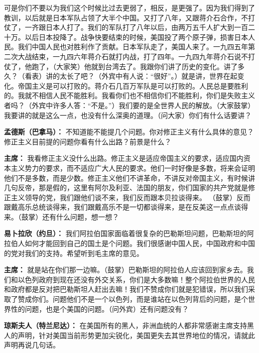 \begin{list}{}
可是你们不要以为我们这个时候比过去更弱了，相反，是更强了。因为我们得到了教训，以后就是日本军队占领了大半个中国。又打了八年，又跟蒋介石合作，不打仗了，一齐跟日本人打了。我们的军队打了八年以后，由两万五千人扩大到一百二十万。以后日本投降了。战争快要结束的时候，美国投了两个原子弹，损害日本人民。我们中国人民也对胜利作了贡献。日本军队走了，美国人来了。一九四五年第二次大战结束，一九四六年蒋介石就打内战，打了四年。一九四九年蒋介石说不打仗了，他跑了，（大家笑）他就到台湾去了。我跟你们讲了历史的变化。讲了多久？（看表）讲的太长了吧？（外宾中有人说：“很好”。）就是讲，世界在起变化。帝国主义是可以打败的。蒋介石几百万军队是可以打败的。人民总是要胜利的。我就不相信人民不能胜利。我看你们也不相信你们不能胜利，你们是失败主义者吗？（外宾中许多人答：“不是。”）我们要的是全世界人民的解放。（大家鼓掌）我要讲的就是这么一点，也没有什么深奥的道理。（问大家）你们有什么话要讲？

\item[\textbf{孟德斯（巴拿马）：}] 不知道能不能提几个问题。你对修正主义有什么具体的意见？修正主义目前提的问题你看有什么出路？前景是什么？

\item[\textbf{主席：}] 我看修正主义没什么出路。修正主义是适应帝国主义的要求，适应国内资本主义势力的要求，而不适应广大人民的要求。他们一时好像是多数，将来会证明他们不是多数，而是少数。修正主义他们不讲革命，不讲反对帝国主义，有时候讲几句反帝，那是假的，这里有阿尔及利亚、法国的朋友，你们国家的共产党就是修正主义领导的党，我们跟他们谈不来，我们反而跟本贝拉谈得来。 （鼓掌）反而跟戴高乐总统谈得来，我们跟戴高乐不是一切都谈得来，是在反美这一点点谈得来。（鼓掌）还有什么问题，想一想？

\item[\textbf{易卜拉欣（约旦）：}] 我们阿拉伯国家面临着很复杂的巴勒斯坦问题，巴勒斯坦的阿拉伯人如何才能回到自己的国土是个问题。我们很感谢中国人民，中国政府和中国的党对我们的支持。希望听到毛主席的意见。

\item[\textbf{主席：}] 就是站在你们那一边嘛。（鼓掌）巴勒斯坦的阿拉伯人应该回到家乡去。我们和以色列政府到现在还没有外交关系，你们是大多数嘛！整个阿拉伯世界的人民和政府都是反对把巴勒斯坦人赶出去嘛！我们不赞成你们就是犯错误，所以我们采取了赞成你们。问题他们不是一个以色列，而是谁站在以色列背后的问题，是个世界性的问题，也是个美国的问题。（问外宾）还有问题没有？

\item[\textbf{琼斯夫人（特兰尼达）：}] 在美国所有的黑人，非洲血统的人都非常感谢主席支持黑人的声明，针对美国当前形势更加尖锐化，美国更失去其世界地位的情况，请就此声明再说几句话。


\end{list}
